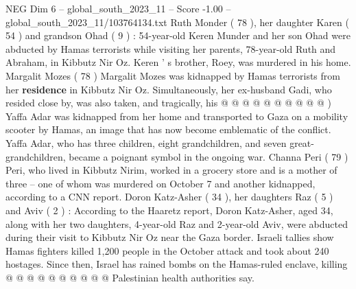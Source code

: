 \begin{textsample}{NEG Dim 6 – global\_south\_2023\_11 – Score -1.00 – global\_south\_2023\_11/103764134.txt}
Ruth Monder ( 78 ), her daughter Karen ( 54 ) and grandson Ohad ( 9 ) : 54-year-old Keren Munder and her son Ohad were abducted by Hamas terrorists while visiting her parents, 78-year-old Ruth and Abraham, in Kibbutz Nir Oz.
Keren ' s brother, Roey, was murdered in his home.
Margalit Mozes ( 78 ) Margalit Mozes was kidnapped by Hamas terrorists from her \textbf{residence} in Kibbutz Nir Oz.
Simultaneously, her ex-husband Gadi, who resided close by, was also taken, and tragically, his @ @ @ @ @ @ @ @ @ @ ) Yaffa Adar was kidnapped from her home and transported to Gaza on a mobility scooter by Hamas, an image that has now become emblematic of the conflict.
Yaffa Adar, who has three children, eight grandchildren, and seven great-grandchildren, became a poignant symbol in the ongoing war.
Channa Peri ( 79 ) Peri, who lived in Kibbutz Nirim, worked in a grocery store and is a mother of three -- one of whom was murdered on October 7 and another kidnapped, according to a CNN report.
Doron Katz-Asher ( 34 ), her daughters Raz ( 5 ) and Aviv ( 2 ) : According to the Haaretz report, Doron Katz-Asher, aged 34, along with her two daughters, 4-year-old Raz and 2-year-old Aviv, were abducted during their visit to Kibbutz Nir Oz near the Gaza border.
Israeli tallies show Hamas fighters killed 1,200 people in the October attack and took about 240 hostages.
Since then, Israel has rained bombs on the Hamas-ruled enclave, killing @ @ @ @ @ @ @ @ @ @ Palestinian health authorities say.

\end{textsample}
